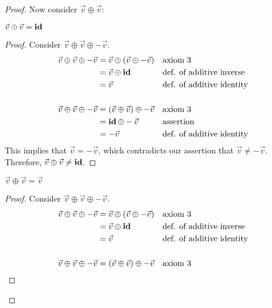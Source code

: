 \documentclass{article}
\begin{document}
\begin{proof}
    Now consider $\vec{v} \oplus \vec{v}$:
    \begin{enumerate}
         $\vec{v} \oplus \vec{v} = \operatorname{\textbf{id}}$
        \begin{proof}
            Consider $\vec{v} \oplus \vec{v} \oplus -\vec{v}$.
            \begin{align*}
                \vec{v} \oplus \vec{v} \oplus -\vec{v} & = \vec{v} \oplus (\vec{v} \oplus -\vec{v}) &  & \text{axiom 3}                   \\
                                                       & = \vec{v} \oplus \operatorname{\textbf{id}}                       &  & \text{def. of additive inverse}  \\
                                                       & = \vec{v}                                  &  & \text{def. of additive identity} \\ \\
                \vec{v} \oplus \vec{v} \oplus -\vec{v} & = (\vec{v} \oplus \vec{v}) \oplus -\vec{v} &  & \text{axiom 3}                   \\
                                                       & = \operatorname{\textbf{id}} \oplus -\vec{v}                      &  & \text{assertion}                 \\
                                                       & = -\vec{v}                                 &  & \text{def. of additive identity}
            \end{align*}
            This implies that $\vec{v} = -\vec{v}$, which contradicts our assertion that $\vec{v} \neq -\vec{v}$. Therefore, $\vec{v} \oplus \vec{v} \neq \operatorname{\textbf{id}}$.
        \end{proof}
         $\vec{v} \oplus \vec{v} = \vec{v}$
        \begin{proof}
            Consider $\vec{v} \oplus \vec{v} \oplus -\vec{v}$.
            \begin{align*}
                \vec{v} \oplus \vec{v} \oplus -\vec{v} & = \vec{v} \oplus (\vec{v} \oplus -\vec{v}) &  & \text{axiom 3}                   \\
                                                       & = \vec{v} \oplus \id                       &  & \text{def. of additive inverse}  \\
                                                       & = \vec{v}                                  &  & \text{def. of additive identity} \\ \\
                \vec{v} \oplus \vec{v} \oplus -\vec{v} & = (\vec{v} \oplus \vec{v}) \oplus -\vec{v} &  & \text{axiom 3}                   \\

\end{align*}
\end{proof}
\end{enumerate}
\end{proof}
\end{document}
